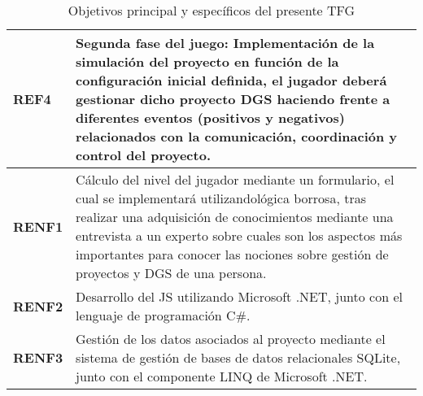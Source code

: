 \begin{table}[!th]
{\begin{tabular}{|l|p{15cm}|}
			\rowcolor[HTML]{FFCE93} 
			{\color[HTML]{000000} \textbf{REF4}}                                                                   & {\color[HTML]{000000} Segunda fase del juego: Implementación de la simulación del proyecto en función de la configuración inicial definida, el jugador deberá gestionar dicho proyecto DGS haciendo frente a diferentes eventos (positivos y negativos) relacionados con la comunicación, coordinación y control del proyecto.}             \\ \hline
			\rowcolor[HTML]{CBCEFB} 
			{\color[HTML]{000000} \textbf{RENF1}}                                                                   & {\color[HTML]{000000} Cálculo del nivel del jugador mediante un formulario, el cual se implementará utilizandológica borrosa, tras realizar una adquisición de conocimientos mediante una entrevista a un experto sobre cuales son los aspectos más importantes para conocer las nociones sobre gestión de proyectos y DGS de una persona.} \\ \hline
			\rowcolor[HTML]{CBCEFB} 
			{\color[HTML]{000000} \textbf{RENF2}}                                                                   & {\color[HTML]{000000} Desarrollo del JS utilizando Microsoft .NET, junto con el lenguaje de programación C\#.}                                                                                                                                                                                                                              \\ \hline
			\rowcolor[HTML]{CBCEFB} 
			{\color[HTML]{000000} \textbf{RENF3}}                                                                   & {\color[HTML]{000000} Gestión de los datos asociados al proyecto mediante el sistema de gestión de bases de datos relacionales SQLite, junto con el componente LINQ de Microsoft .NET.}                                                                                                                                                     \\ \hline
		\end{tabular}}
		\caption{Objetivos principal y específicos del presente TFG}
		\label{tab:ResumenObjetivos}
	\end{table}